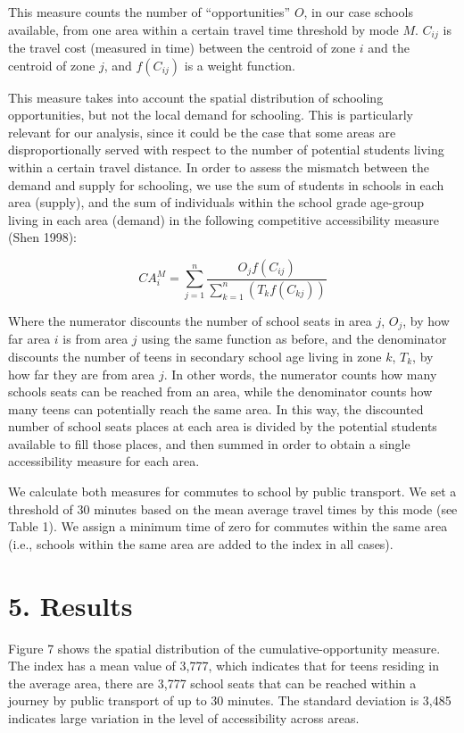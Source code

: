 \documentclass[]{article}
\begin{document}
This measure counts the number of ``opportunities'' \(O\), in our case
schools available, from one area within a certain travel time threshold
by mode \(M\). \(C_{ij}\) is the travel cost (measured in time) between
the centroid of zone \(i\) and the centroid of zone \(j\), and
\(f(C_{ij})\) is a weight function.

This measure takes into account the spatial distribution of schooling
opportunities, but not the local demand for schooling. This is
particularly relevant for our analysis, since it could be the case that
some areas are disproportionally served with respect to the number of
potential students living within a certain travel distance. In order to
assess the mismatch between the demand and supply for schooling, we use
the sum of students in schools in each area (supply), and the sum of
individuals within the school grade age-group living in each area
(demand) in the following competitive accessibility measure (Shen 1998):

\[ CA_{i}^M= \sum_{j=1}^n\frac{O_{j}f(C_{ij})}{\sum_{k=1}^n(T_{k}f(C_{kj}))}\]

Where the numerator discounts the number of school seats in area \(j\),
\(O_{j}\), by how far area \(i\) is from area \(j\) using the same
function as before, and the denominator discounts the number of teens in
secondary school age living in zone \(k\), \(T_{k}\), by how far they
are from area \(j\). In other words, the numerator counts how many
schools seats can be reached from an area, while the denominator counts
how many teens can potentially reach the same area. In this way, the
discounted number of school seats places at each area is divided by the
potential students available to fill those places, and then summed in
order to obtain a single accessibility measure for each area.

We calculate both measures for commutes to school by public transport.
We set a threshold of 30 minutes based on the mean average travel times
by this mode (see Table 1). We assign a minimum time of zero for
commutes within the same area (i.e., schools within the same area are
added to the index in all cases).

\section{5. Results}\label{results}

Figure 7 shows the spatial distribution of the cumulative-opportunity
measure. The index has a mean value of 3,777, which indicates that for
teens residing in the average area, there are 3,777 school seats that
can be reached within a journey by public transport of up to 30 minutes.
The standard deviation is 3,485 indicates large variation in the level
of accessibility across areas.
\end{document}
